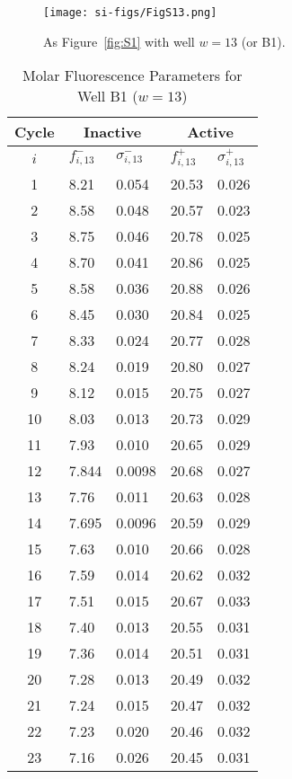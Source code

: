                 \begin{figure}
                    \centering
                    \texttt{[image: si-figs/FigS13.png]}
                    \caption{
                        As Figure~\ref{fig:S1} with well $w=13$ (or B1).
                    }
                \end{figure}
                \clearpage
    \begin{table}
        \caption{Molar Fluorescence Parameters for Well B1 ($w=13$)}
        \centering
        \begin{tabular}{c|ll|ll}
            Cycle & \multicolumn{2}{c|}{Inactive} & \multicolumn{2}{c}{Active} \\
            \hline
            $i$ & $f_{i,13}^{-}$ & $\sigma_{i,13}^{-}$ &  $f_{i,13}^{+}$ & $\sigma_{i,13}^{+}$ \\
            \hline
    1 & 8.21 & 0.054 & 20.53 & 0.026 \\
2 & 8.58 & 0.048 & 20.57 & 0.023 \\
3 & 8.75 & 0.046 & 20.78 & 0.025 \\
4 & 8.70 & 0.041 & 20.86 & 0.025 \\
5 & 8.58 & 0.036 & 20.88 & 0.026 \\
6 & 8.45 & 0.030 & 20.84 & 0.025 \\
7 & 8.33 & 0.024 & 20.77 & 0.028 \\
8 & 8.24 & 0.019 & 20.80 & 0.027 \\
9 & 8.12 & 0.015 & 20.75 & 0.027 \\
10 & 8.03 & 0.013 & 20.73 & 0.029 \\
11 & 7.93 & 0.010 & 20.65 & 0.029 \\
12 & 7.844 & 0.0098 & 20.68 & 0.027 \\
13 & 7.76 & 0.011 & 20.63 & 0.028 \\
14 & 7.695 & 0.0096 & 20.59 & 0.029 \\
15 & 7.63 & 0.010 & 20.66 & 0.028 \\
16 & 7.59 & 0.014 & 20.62 & 0.032 \\
17 & 7.51 & 0.015 & 20.67 & 0.033 \\
18 & 7.40 & 0.013 & 20.55 & 0.031 \\
19 & 7.36 & 0.014 & 20.51 & 0.031 \\
20 & 7.28 & 0.013 & 20.49 & 0.032 \\
21 & 7.24 & 0.015 & 20.47 & 0.032 \\
22 & 7.23 & 0.020 & 20.46 & 0.032 \\
23 & 7.16 & 0.026 & 20.45 & 0.031 \\

\end{tabular}
\end{table}
